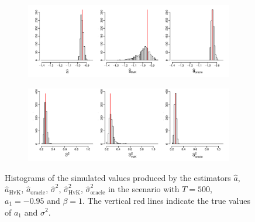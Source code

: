 \begin{figure}[t!]
\centering
\begin{subfigure}[b]{\textwidth}
\includegraphics[width=\textwidth]{Plots/a_hat_histograms_a1=-95_T=500_slope=10_(L1,L2,K1,K2,M1,M2)=(25,25,5,10,20,30).pdf}
\end{subfigure}
\begin{subfigure}[b]{\textwidth}
\includegraphics[width=\textwidth]{Plots/lrv_histograms_a1=-95_T=500_slope=10_(L1,L2,K1,K2,M1,M2)=(25,25,5,10,20,30).pdf}
\end{subfigure}
\caption{Histograms of the simulated values produced by the estimators $\widehat{a}$, $\widehat{a}_{\text{HvK}}$, $\widehat{a}_{\text{oracle}}$, $\widehat{\sigma}^2$, $\widehat{\sigma}^2_{\text{HvK}}$, $\widehat{\sigma}^2_{\text{oracle}}$ in the scenario with $T=500$, $a_1 = -0.95$ and $\beta = 1$. The vertical red lines indicate the true values of $a_1$ and $\sigma^2$.}\label{fig:hist_scenario1} 
\end{figure}


